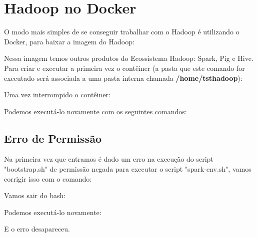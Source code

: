 \section{Hadoop no Docker}
O modo mais simples de se conseguir trabalhar com o Hadoop é utilizando o Docker, para baixar a imagem do Hadoop: \\

Nessa imagem temos outros produtos do Ecossistema Hadoop: Spark, Pig e Hive. Para criar e executar a primeira vez o contêiner (a pasta que este comando for executado será associada a uma pasta interna chamada \textbf{/home/tsthadoop}): \\

Uma vez interrompido o contêiner: \\

Podemos executá-lo novamente com os seguintes comandos: \\

\subsection{Erro de Permissão}
Na primeira vez que entramos é dado um erro na execução do script "bootstrap.sh" de permissão negada para executar o script "spark-env.sh", vamos corrigir isso com o comando: \\

Vamos sair do bash: \\

Podemos executá-lo novamente: \\

E o erro desapareceu.
